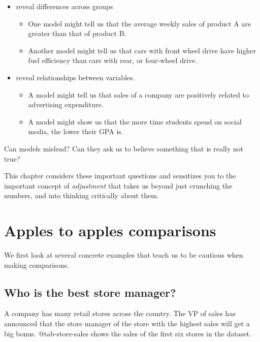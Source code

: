 \documentclass[
  12pt,
  letterpaper,
  DIV=11,
  numbers=noendperiod]{scrreprt}
\providecommand{\tightlist}{%
  \setlength{\itemsep}{0pt}\setlength{\parskip}{0pt}}
\begin{document}
\begin{itemize}
\tightlist
\item
  reveal differences across groups

  \begin{itemize}
  \tightlist
  \item
    One model might tell us that the average weekly sales of product A
    are greater than that of product B.
  \item
    Another model might tell us that cars with front wheel drive have
    higher fuel efficiency than cars with rear, or four-wheel drive.
  \end{itemize}
\item
  reveal relationships between variables.

  \begin{itemize}
  \tightlist
  \item
    A model might tell us that sales of a company are positively related
    to advertising expenditure.
  \item
    A model might show us that the more time students spend on social
    media, the lower their GPA is.
  \end{itemize}
\end{itemize}

Can models mislead? Can they ask us to believe something that is really
not true?

This chapter considers these important questions and sensitizes you to
the important concept of \emph{adjustment} that takes us beyond just
crunching the numbers, and into thinking critically about them.

\section{Apples to apples
comparisons}\label{apples-to-apples-comparisons}

We first look at several concrete examples that teach us to be cautious
when making comparisons.

\subsection{Who is the best store
manager?}\label{who-is-the-best-store-manager}

A company has many retail stores across the country. The VP of sales has
announced that the store manager of the store with the highest sales
will get a big bonus. @tab-store-sales shows the sales of the first six
stores in the dataset.
\end{document}
